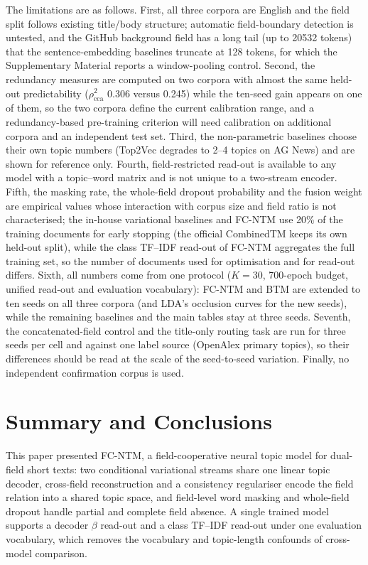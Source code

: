 \documentclass[Journal,letterpaper]{ascelike-new}
\newcommand{\fcntm}{FC-NTM}
\begin{document}
The limitations are as follows. First, all three corpora are English and the field split follows
existing title/body structure; automatic field-boundary detection is untested, and the GitHub
background field has a long tail (up to 20532 tokens) that the sentence-embedding baselines truncate
at 128 tokens, for which the Supplementary Material reports a window-pooling control. Second, the
redundancy measures are computed on two corpora with almost the same held-out predictability
($\rho^2_{\mathrm{cca}}$ 0.306 versus 0.245) while the ten-seed gain appears on one of them, so the two corpora define the current calibration range, and a redundancy-based pre-training criterion will need calibration on additional corpora and an independent test set. Third, the non-parametric
baselines choose their own topic numbers (Top2Vec degrades to 2--4 topics on AG News) and are shown
for reference only. Fourth, field-restricted read-out is available to any model with a
topic--word matrix and is not unique to a two-stream encoder. Fifth, the masking rate, the
whole-field dropout probability and the fusion weight are empirical values whose interaction with
corpus size and field ratio is not characterised; the in-house variational baselines and \fcntm{}
use 20\% of the training documents for early stopping (the official CombinedTM keeps its own
held-out split), while the class TF--IDF read-out of \fcntm{} aggregates the full training set, so
the number of documents used for optimisation and for read-out differs. Sixth, all
numbers come from one protocol ($K=30$, 700-epoch budget, unified read-out and evaluation
vocabulary): \fcntm{} and BTM are extended to ten seeds on all three corpora (and LDA's occlusion
curves for the new seeds), while the remaining baselines and the main tables stay at three seeds.
Seventh, the concatenated-field control and the title-only routing task are run for three seeds
per cell and against one label source (OpenAlex primary topics), so their differences should be
read at the scale of the seed-to-seed variation. Finally, no independent confirmation corpus is
used.

\section{Summary and Conclusions}

This paper presented \fcntm{}, a field-cooperative neural topic model for dual-field short texts:
two conditional variational streams share one linear topic decoder, cross-field reconstruction and a
consistency regulariser encode the field relation into a shared topic space, and field-level word
masking and whole-field dropout handle partial and complete field absence. A single trained model
supports a decoder $\beta$ read-out and a class TF--IDF read-out under one evaluation vocabulary,
which removes the vocabulary and topic-length confounds of cross-model comparison.
\end{document}

